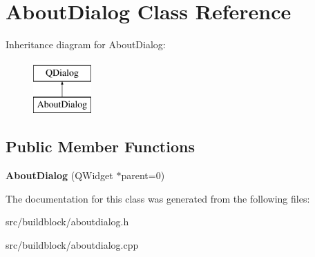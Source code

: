 \hypertarget{classAboutDialog}{}\section{About\+Dialog Class Reference}
\label{classAboutDialog}
Inheritance diagram for About\+Dialog\+:\begin{figure}[H]
\begin{center}
\leavevmode
\includegraphics[height=2.000000cm]{classAboutDialog}
\end{center}
\end{figure}
\subsection*{Public Member Functions}
\begin{DoxyCompactItemize}
\item 
\mbox{\label{classAboutDialog_ad96fc2ce8de7568ace543b7c69c71c56}} 
{\bfseries About\+Dialog} (Q\+Widget $\ast$parent=0)
\end{DoxyCompactItemize}


The documentation for this class was generated from the following files\+:\begin{DoxyCompactItemize}
\item 
src/buildblock/aboutdialog.\+h\item 
src/buildblock/aboutdialog.\+cpp\end{DoxyCompactItemize}
